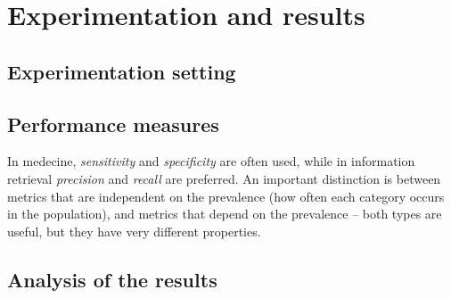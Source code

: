 \section{Experimentation and results}\label{experimentation}

\subsection{Experimentation setting}

\subsection{Performance measures}
In medecine, \emph{sensitivity} and \emph{specificity} are often used, 
while in information retrieval \emph{precision} and \emph{recall} are preferred.
An important distinction is between metrics that are independent on the prevalence
(how often each category occurs in the population), and metrics that depend on the
prevalence – both types are useful, but they have very different properties.

\subsection{Analysis of the results}

